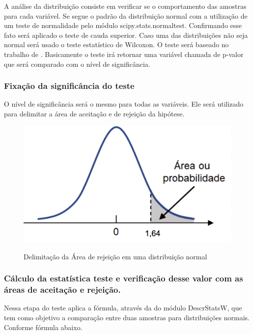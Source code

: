 \setlength\parindent{2em} A análise da distribuição consiste em verificar se o comportamento das amostras para cada variável. Se segue o padrão da distribuição normal com a utilização de um teste de normalidade pelo módulo scipy.stats.normaltest. Confirmando esse fato será aplicado o teste de cauda superior. Caso uma das distribuições não seja normal será usado o teste estatístico de Wilcoxon. O teste será baseado no trabalho de \cite{d1973tests}. Basicamente o teste irá retornar uma variável chamada de p-valor que será comparado com o nível de significância.

\subsubsection{Fixação da significância do teste}

O nível de significância será o mesmo para todas as variáveis. Ele será utilizado para delimitar a área de aceitação e de rejeição da hipótese.

\begin{figure} [!h]
    \centering
    \caption{Delimitação da Área de rejeição em uma distribuição normal}
    \includegraphics [scale=0.35]{Figuras/nivel_aceitacao.png}
    \label{fig:img_distrNormal}
\end{figure}


\subsubsection{Cálculo da estatística teste e verificação desse valor com as áreas de aceitação e rejeição.}

Nessa etapa do teste aplica a fórmula, através da do módulo DescrStatsW, que tem como objetivo a comparação entre duas amostras para distribuições normais. Conforme fórmula abaixo.

